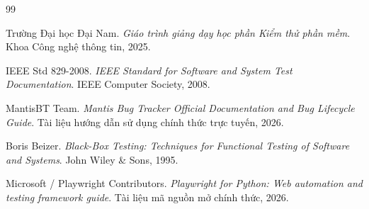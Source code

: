 \renewcommand{\bibname}{Tài liệu tham khảo}
\begin{thebibliography}{99}

Trường Đại học Đại Nam.
\textit{Giáo trình giảng dạy học phần Kiểm thử phần mềm}. Khoa Công nghệ thông tin, 2025.

IEEE Std 829-2008.
\textit{IEEE Standard for Software and System Test Documentation}. IEEE Computer Society, 2008.

MantisBT Team.
\textit{Mantis Bug Tracker Official Documentation and Bug Lifecycle Guide}. Tài liệu hướng dẫn sử dụng chính thức trực tuyến, 2026.

Boris Beizer.
\textit{Black-Box Testing: Techniques for Functional Testing of Software and Systems}. John Wiley \& Sons, 1995.

Microsoft / Playwright Contributors.
\textit{Playwright for Python: Web automation and testing framework guide}. Tài liệu mã nguồn mở chính thức, 2026.

\end{thebibliography}
